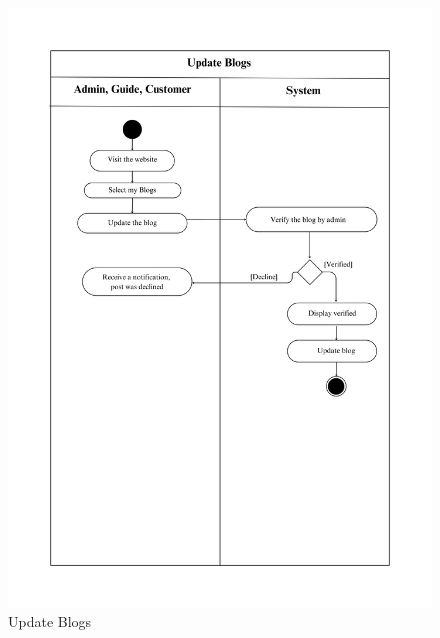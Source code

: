 \begin{figure}[h]
    \centering
    \includegraphics[width=1\textwidth]{Images/Activity Diagrams/9 Update Blogs.png}
    \caption{Update Blogs}
    \label{fig:activity-update-blog}
\end{figure}

